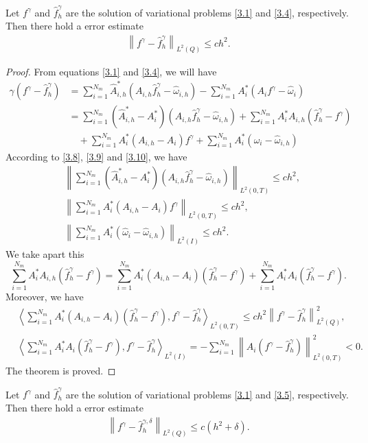 \documentclass[]{article}
\begin{document}
\begin{dl}\label{dl3.3}
	Let $f^\gamma$ and $\hat{f}^\gamma_h$ are the solution of variational problems \eqref{3.1} and \eqref{3.4}, respectively. Then there hold a error estimate
	\begin{align}\label{3.11}
	\left\|f^\gamma-\hat{f}^\gamma_h \right\|_{L^2(Q)}\leq ch^2.
	\end{align}
\end{dl}
\begin{proof} From equations \eqref{3.1} and \eqref{3.4}, we will have
	\begin{align*}
		\gamma \left(f^\gamma-\hat{f}^\gamma_h\right)&=\sum_{i=1}^{N_m}\hat{A}^*_{i, h}\left(A_{i, h}\hat{f}^\gamma_h-\hat{\omega}_{i, h}\right)-\sum_{i=1}^{N_m}A^*_i\left(A_if^\gamma-\hat{\omega}_i\right)\\
		&=\sum_{i=1}^{N_m}\left(\hat{A}^*_{i, h}-A^*_i\right)\left(A_{i, h}\hat{f}^\gamma_h-\hat{\omega}_{i, h}\right)+\sum_{i=1}^{N_m}A^*_iA_{i, h}\left(\hat{f}^\gamma_h-f^\gamma\right)\\
		&\quad+\sum_{i=1}^{N_m}A_i^*\left(A_{i, h}-A_i\right)f^\gamma+\sum_{i=1}^{N_m}A^*_i\left(\hat{\omega}_i-\hat{\omega}_{i, h}\right)
	\end{align*}
	According to \eqref{3.8}, \eqref{3.9} and \eqref{3.10}, we have
	\begin{align*}
		&\left\|\sum_{i=1}^{N_m} \left(\hat{A}^*_{i, h}-A^*_i\right)\left(A_{i, h}\hat{f}^\gamma_h-\hat{\omega}_{i, h}\right)\right\|_{L^2(0, T)}\leq ch^2,\\
		&\left\|\sum_{i=1}^{N_m} A^*_i\left(A_{i, h}-A_i\right)f^\gamma\right\|_{L^2(0, T)}\leq ch^2,\\
		&\left\|\sum_{i=1}^{N_m}A^*_i\left(\hat{\omega}_i-\hat{\omega}_{i, h}\right) \right\|_{L^2(I)}\leq ch^2.
	\end{align*}
	We take apart this
	$$\sum_{i=1}^{N_m}A^*_iA_{i, h}\left(\hat{f}^\gamma_h-f^\gamma\right)=\sum_{i=1}^{N_m}A^*_i\left(A_{i, h}-A_i\right)\left(\hat{f}^\gamma_h-f^\gamma\right)+\sum_{i=1}^{N_m}A^*_iA_i\left(\hat{f}^\gamma_h-f^\gamma\right).$$
	Moreover, we have
	\begin{align*}
		&\left\langle \sum_{i=1}^{N_m}A^*_i\left(A_{i, h}-A_i\right)\left(\hat{f}^\gamma_h-f^\gamma\right), f^\gamma-\hat{f}^\gamma_h\right\rangle_{L^2(0, T)}\leq ch^2\left\| f^\gamma-\hat{f}^\gamma_h\right\|^2_{L^2(Q)},\\
		&\left\langle \sum_{i=1}^{N_m}A^*_iA_i\left(\hat{f}^\gamma_h-f^\gamma\right), f^\gamma-\hat{f}^\gamma_h\right\rangle_{L^2(I)}=-\sum_{i=1}^{N_m}\left\|A_i\left(f^\gamma-\hat{f}^\gamma_h\right) \right\|^2_{L^2(0, T)}<0.
	\end{align*}
	The theorem is proved.
\end{proof}
\begin{cy}\label{cy3.1}
	Let $f^\gamma$ and $\hat{f}^\gamma_h$ are the solution of variational problems \eqref{3.1} and \eqref{3.5}, respectively. Then there hold a error estimate
	\begin{align}\label{3.12}
		\left\|f^\gamma-\hat{f}^{\gamma, \delta}_h \right\|_{L^2(Q)}\leq c(h^2+\delta).
	\end{align}
\end{cy}
\end{document}
